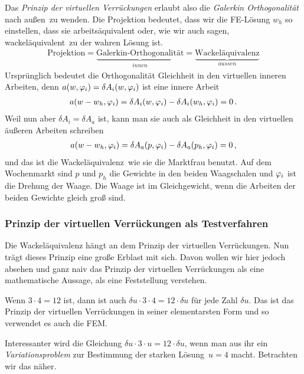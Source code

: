 Das {\em Prinzip der virtuellen Verr\"{u}ckungen\/} erlaubt also die {\em Galerkin Orthogonalit\"{a}t\/} nach \glq au{\ss}en\grq\ zu wenden. Die Projektion bedeutet, dass wir die FE-L\"{o}sung $w_h$ so einstellen, dass sie arbeits\"{a}quivalent oder, wie wir auch sagen, \glq wackel\"{a}quivalent\grq\ zu der wahren L\"{o}sung ist.\\
\begin{align}
\text{Projektion} = \underbrace{\text{Galerkin-Orthogonalit\"{a}t}}_{innen} = \underbrace{\text{Wackel\"{a}quivalenz}}_{aussen}
\end{align}
Urspr\"{u}nglich bedeutet die Orthogonalit\"{a}t Gleichheit in den virtuellen inneren Arbeiten, denn $a(w,\varphi_i) = \delta A_i(w,\varphi_i)$ ist eine innere Arbeit
\begin{align}
a(w -w_h,\varphi_i) = \delta A_i(w,\varphi_i) - \delta A_i(w_h,\varphi_i) = 0\,.
\end{align}
Weil nun aber $\delta A_i = \delta A_a$ ist, kann man sie auch als Gleichheit in den virtuellen \"{a}u{\ss}eren Arbeiten schreiben
\begin{align}
a(w -w_h,\varphi_i) = \delta A_a(p,\varphi_i) - \delta A_a(p_h,\varphi_i) = 0\,,
\end{align}
und das ist die \glq Wackel\"{a}quivalenz\grq\, wie sie die Marktfrau benutzt. Auf dem Wochenmarkt sind $p$ und $p_h$ die Gewichte in den beiden Waagschalen und $\varphi_i$ ist die Drehung der Waage. Die Waage ist im Gleichgewicht, wenn die Arbeiten der beiden Gewichte gleich gro{\ss} sind.

{\textcolor{sectionTitleBlue}{\subsubsection*{Prinzip der virtuellen Verr\"{u}ckungen als Testverfahren}}}
Die Wackel\"{a}quivalenz h\"{a}ngt an dem Prinzip der virtuellen Verr\"{u}ckungen. Nun tr\"{a}gt dieses Prinzip eine gro{\ss}e Erblast mit sich. Davon wollen wir hier jedoch absehen und ganz naiv das Prinzip der virtuellen Verr\"{u}ckungen als eine mathematische Aussage, als eine Feststellung verstehen.

Wenn $3\cdot 4 = 12$ ist, dann ist auch $\delta u\cdot 3 \cdot 4 = 12 \cdot \delta u$ f\"{u}r jede Zahl
$\delta u$. Das ist das Prinzip der virtuellen Verr\"{u}ckungen in seiner elementarsten Form und so verwendet es auch die FEM.

Interessanter wird die Gleichung $\delta u \cdot 3 \cdot u = 12 \cdot \delta u$, wenn man aus ihr ein {\em Variationsproblem\/} zur Be\-stimmung der \glq starken L\"{o}sung\grq\ $ u = 4$ macht. Betrachten wir das n\"{a}her.

